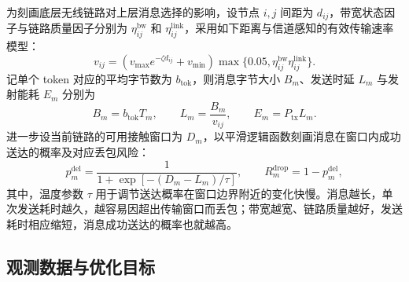 为刻画底层无线链路对上层消息选择的影响，设节点 $i,j$ 间距为 $d_{ij}$，带宽状态因子与链路质量因子分别为 $\eta_{ij}^{\mathrm{bw}}$ 和 $\eta_{ij}^{\mathrm{link}}$，采用如下距离与信道感知的有效传输速率模型：
\begin{equation}
v_{ij}=\left(v_{\max}e^{-\zeta d_{ij}}+v_{\min}\right)
\max\{0.05,\eta_{ij}^{\mathrm{bw}}\eta_{ij}^{\mathrm{link}}\}.
\label{rq2:eq:rate}
\end{equation}
记单个 token 对应的平均字节数为 $b_{\mathrm{tok}}$，则消息字节大小 $B_m$、发送时延 $L_m$ 与发射能耗 $E_m$ 分别为
\begin{equation}
B_m=b_{\mathrm{tok}}T_m,\qquad
L_m=\frac{B_m}{v_{ij}},\qquad E_m=P_{\mathrm{tx}}L_m.
\label{rq2:eq:cost}
\end{equation}
进一步设当前链路的可用接触窗口为 $D_m$，以平滑逻辑函数刻画消息在窗口内成功送达的概率及对应丢包风险：
\begin{equation}
p_m^{\mathrm{del}}=\frac{1}{1+\exp[-(D_m-L_m)/\tau]},\qquad
R_m^{\mathrm{drop}}=1-p_m^{\mathrm{del}},
\label{rq2:eq:delivery}
\end{equation}
其中，温度参数 $\tau$ 用于调节送达概率在窗口边界附近的变化快慢。消息越长，单次发送耗时越久，越容易因超出传输窗口而丢包；带宽越宽、链路质量越好，发送耗时相应缩短，消息成功送达的概率也就越高。

\subsection{观测数据与优化目标}

